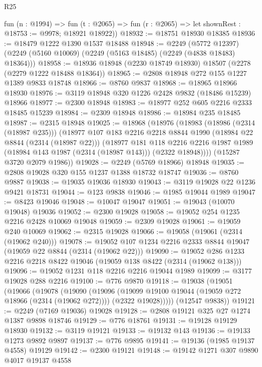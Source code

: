 \begin{lexlean}{R25}
\begin{coremodule}
      fun (n : @1994) =>
      fun (t : @2065) => fun (r : @2065) => let shownRest : @18753 := @9978; @18921 @18922))
@18932 := @18751 @18930 @18385
@18936 := @18479 @1222 @1390 @1537 @18488
@18948 := @2249
    (@5772 @12397)
    (@2249 (@5160 @10069) (@2249 (@5163 @18485) (@2249 (@4838 @18483) @18364)))
@18958 := @18936 @18948 (@2230 @18749 @18930) @18507 (@2278 (@2279 @1222 @18488 @18364))
@18965 := @2808 @18948 @272 @155 @1227 @1389 @9833 @18748
@18966 := @8760 @9837
@18968 := @18965 @18966 @18930
@18976 := @3119 @18948 @320 @1226 @2428 @9832 (@18486 @15239) @18966
@18977 := @2300 @18948
@18983 := @18977 @252 @605 @2216 @2333 @18485 @15239
@18984 := @2309 @18948
@18986 := @18984 @235 @18485
@18987 := @2315 @18948
@19025 := @18968
    (@18976
      (@18983
        (@18986 (@2314 (@18987 @235)))
        (@18977
          @107
          @183
          @2216
          @2218
          @8844
          @1990
          (@18984 @22 @8844 (@2314 (@18987 @22)))
          (@18977
            @181
            @118
            @2216
            @2216
            @1987
            @1989
            (@18984 @143 @1987 (@2314 (@18987 @143)))
            (@2322 @18948))))
      (@15287 @3720 @2079 @1986))
@19028 := @2249 (@5769 @18966) @18948
@19035 := @2808 @19028 @320 @155 @1237 @1388 @18732 @18747
@19036 := @8760 @9887
@19038 := @19035 @19036 @18930
@19043 := @3119 @19028 @22 @1236 @9421 @18731
@19044 := @123 @9838
@19046 := @1985 @19044 @1989
@19047 := @8423 @19046
@19048 := @10047 @19047
@19051 := @19043 (@10070 @19048) @19036
@19052 := @2300 @19028
@19058 := @19052 @254 @1235 @2216 @2428 @10069 @19048
@19059 := @2309 @19028
@19061 := @19059 @240 @10069
@19062 := @2315 @19028
@19066 := @19058 (@19061 (@2314 (@19062 @240)))
@19078 := @19052 @107 @1234 @2216 @2333 @8844 @19047 (@19059 @22 @8844 (@2314 (@19062 @22)))
@19090 := @19052 @286 @1233 @2216 @2218 @8422 @19046 (@19059 @138 @8422 (@2314 (@19062 @138)))
@19096 := @19052 @1231 @118 @2216 @2216 @19044 @1989
@19099 := @3177 @19028 @288 @2216
@19100 := @776 @9870
@19118 := @19038
    (@19051
      (@19066
        (@19078
          (@19090
            (@19096
              (@19099 @19100 @19044 (@19059 @272 @18966 (@2314 (@19062 @272))))
              (@2322 @19028)))))
      (@12547 @9838))
@19121 := @2249 (@7169 @19036) @19028
@19128 := @2808 @19121 @325 @27 @1274 @1387 @9898 @18746
@19129 := @776 @18761
@19131 := @19128 @19129 @18930
@19132 := @3119 @19121
@19133 := @19132 @143
@19136 := @19133 @1273 @9892 @9897
@19137 := @776 @9895
@19141 := @19136 (@1985 @19137 @4558) @19129
@19142 := @2300 @19121
@19148 := @19142 @1271 @307 @9890 @4017 @19137 @4558

\end{coremodule}
\end{lexlean}
